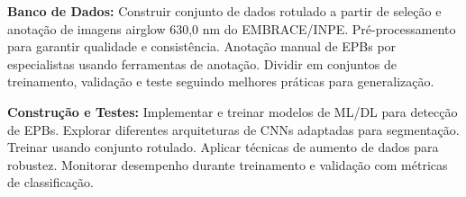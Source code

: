\documentclass[twocolumn]{article}
\begin{document}
\textbf{Banco de Dados:} Construir conjunto de dados rotulado a partir de seleção e anotação de imagens airglow 630,0 nm do EMBRACE/INPE. Pré-processamento para garantir qualidade e consistência. Anotação manual de EPBs por especialistas usando ferramentas de anotação. Dividir em conjuntos de treinamento, validação e teste seguindo melhores práticas para generalização.

\textbf{Construção e Testes:} Implementar e treinar modelos de ML/DL para detecção de EPBs. Explorar diferentes arquiteturas de CNNs adaptadas para segmentação. Treinar usando conjunto rotulado. Aplicar técnicas de aumento de dados para robustez. Monitorar desempenho durante treinamento e validação com métricas de classificação.

\printbibliography
\end{document}
